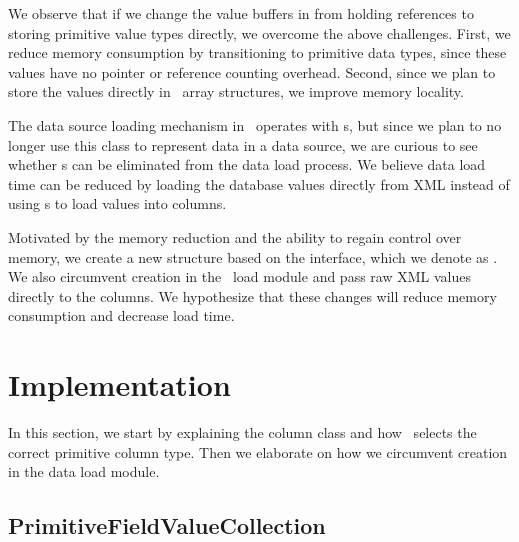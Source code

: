 We observe that if we change the value buffers in  from holding  references to storing primitive value types directly, we overcome the above challenges. First, we reduce memory consumption by transitioning to primitive data types, since these values have no pointer or reference counting overhead. Second, since we plan to store the values directly in \delphi~array structures, we improve memory locality.

The data source loading mechanism in \gap~operates with s, but since we plan to no longer use this class to represent data in a data source, we are curious to see whether s can be eliminated from the data load process. We believe data load time can be reduced by loading the database values directly from XML instead of using s to load values into columns.

Motivated by the memory reduction and the ability to regain control over memory, we create a new structure based on the  interface, which we denote as . We also circumvent  creation in the \gap~load module and pass raw XML values directly to the columns. We hypothesize that these changes will reduce memory consumption and decrease load time.

\section{Implementation}
\label{sec:Implementation}
In this section, we start by explaining the  column class and how \gap~selects the correct primitive column type. Then we elaborate on how we circumvent  creation in the data load module.

\subsection{PrimitiveFieldValueCollection}
\label{sub:PrimitiveFieldValueCollection}


